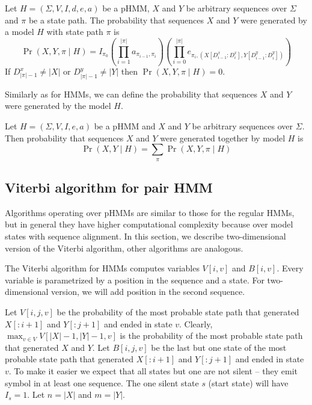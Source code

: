 \begin{definition}
Let $H=(\Sigma,V,I,d,e,a)$ be  a pHMM, $X$ and $Y$ be arbitrary sequences over
$\Sigma$ and $\pi$ be a state path. The probability that sequences $X$ and $Y$
were generated by a model $H$  with state path $\pi$ is
\begin{equation}
\Pr\left(X,Y,\pi\mid H\right)=
I_{\pi_0}
\left(
	\prod_{i=1}^{|\pi|}a_{\pi_{i-1},\pi_i}
\right)
\left(
	\prod_{i=0}^{|\pi|}e_{\pi_i,(X[D^x_{i-1}:D^x_{i}],Y[D^y_{i-1}:D^y_{i}])}
\right)
\end{equation}
If $D^x_{|\pi|-1}\not=|X|$ or $D^y_{|\pi|-1}\not=|Y|$ then
$\Pr\left(X,Y,\pi\mid H\right)=0$. 
\end{definition}

Similarly as for HMMs, we can define the probability that sequences $X$ and $Y$ were
generated by the model $H$.

\begin{definition}
Let $H=(\Sigma,V,I,e,a)$ be a pHMM and  $X$ and $Y$ be arbitrary sequences over
$\Sigma$. Then probability that sequences $X$ and $Y$ were generated together by
model $H$ is 
\begin{equation}
\Pr\left(X,Y\mid H\right)=\sum_{\pi}\Pr\left(X,Y,\pi\mid H\right)
\end{equation}
\end{definition}


\subsection{Viterbi algorithm for pair HMM}

Algorithms operating over pHMMs are similar to those for the regular HMMs, but in
general they have higher computational complexity because over model states with
sequence alignment.
In this section, we describe two-dimensional version of the Viterbi algorithm,
other algorithms are analogous.

The Viterbi algorithm for HMMs computes variables $V[i,v]$ and $B[i,v]$. Every
variable is parametrized by a position in the sequence and a state. For
two-dimensional version, we will add position in the second sequence.

Let $V[i,j,v]$ be the probability of the most probable state path that generated
$X[:i+1]$ and $Y[:j+1]$ and ended in state $v$. Clearly, $\max_{v\in
V}V[|X|-1,|Y|-1,v]$ is the probability of the most probable state path that
generated $X$ and $Y$. Let $B[i,j,v]$ be the last but one state of the most
probable state path that generated $X[:i+1]$ and $Y[:j+1]$ and ended in state
$v$. To make it easier we expect that all states but one are not silent -- they emit
symbol in at least one sequence. The one silent state $s$ (start state) will have $I_s=1$.
 Let $n=|X|$ and $m=|Y|$.


